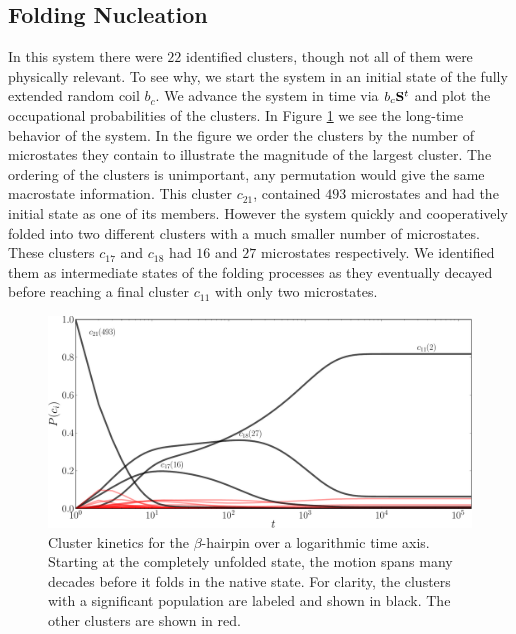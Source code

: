 \subsection{Folding Nucleation}
In this system there were $22$ identified clusters, though not all of them were physically relevant. To see why, we start the system in an initial state of the fully extended random coil $b_c$. We advance the system in time via $b_c {\bf S}^t$ and plot the occupational probabilities of the clusters. In Figure \ref{fig:beta_hairpin_kinetics} we see the long-time behavior of the system. In the figure we order the clusters by the number of microstates they contain to illustrate the magnitude of the largest cluster. The ordering of the clusters is unimportant, any permutation would give the same macrostate information. This cluster $c_{21}$, contained $493$ microstates and had the initial state as one of its members. However the system quickly and cooperatively folded into two different clusters with a much smaller number of microstates. These clusters $c_{17}$ and $c_{18}$ had $16$ and $27$ microstates respectively. We identified them as intermediate states of the folding processes as they eventually decayed before reaching a final cluster $c_{11}$ with only two microstates. 
%
\begin{figure}[tb]
  \includegraphics[width=\textwidth]{supplement/beta_cluster_example_2/pictures/kinetics_beta_cluster.pdf}
  \caption{
    Cluster kinetics for the $\beta$-hairpin over a logarithmic time axis. Starting at the completely unfolded state, the motion spans many decades before it folds in the native state. For clarity, the clusters with a significant population are labeled and shown in black. The other clusters are shown in red.
  }
  \label{fig:beta_hairpin_kinetics}
\end{figure}
%

